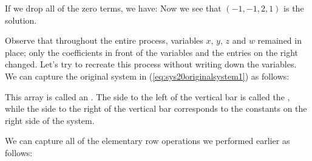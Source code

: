 \documentclass{ximera}
\begin{document}
    If we drop all of the zero terms, we have:
Now we see that $(-1, -1, 2, 1)$ is the solution.

Observe that throughout the entire process, variables $x$, $y$, $z$ and $w$ remained in place; only the coefficients in front of the variables and the entries on the right changed.  Let's try to recreate this process without writing down the variables.  We can capture the original system in (\ref{eq:sys20originalsystem1}) as follows:

 This array is called an .  The side to the left of the vertical bar is called the , while the side to the right of the vertical bar corresponds to the constants on the right side of the system.
 
 We can capture all of the elementary row operations we performed earlier as follows:
\end{document}
